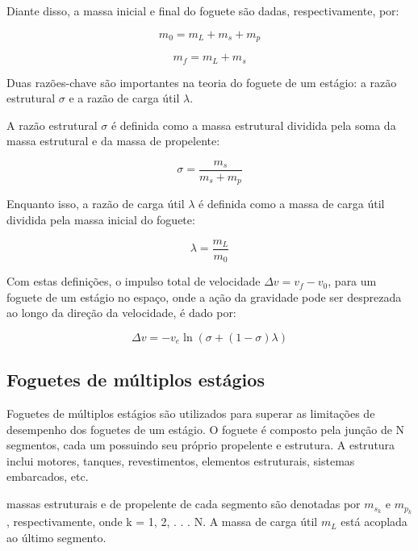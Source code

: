 \par Diante disso, a massa inicial e final do foguete são dadas, respectivamente, por:

\begin{equation}
m_0 = m_L + m_s + m_p   
\end{equation}

\begin{equation}
m_f = m_L + m_s  
\end{equation}

\par Duas razões-chave são importantes na teoria do foguete de um estágio: a razão estrutural $\sigma$ e a razão de carga útil $\lambda$.

\par A razão estrutural $\sigma$ é definida como a massa estrutural dividida pela soma da massa estrutural e da massa de propelente:

\begin{equation}
\sigma = \frac{m_s}{m_s + m_p}
\end{equation}

Enquanto isso, a razão de carga útil $\lambda$ é definida como a massa de carga útil dividida pela massa inicial do foguete:

\begin{equation}
\lambda = \frac{m_L}{m_0}
\end{equation}

Com estas definições, o impulso total de velocidade $\Delta v = v_f - v_0$, para um foguete de um estágio no espaço, onde a ação da gravidade pode ser desprezada ao longo da direção da velocidade, é dado por:

\begin{equation}
\Delta v = -v_e \ln (\sigma + (1 - \sigma)\lambda) 
\end{equation}

\subsection{Foguetes de múltiplos estágios}

\par Foguetes de múltiplos estágios são utilizados para superar as limitações de desempenho dos foguetes de um estágio. O foguete é composto pela junção de N segmentos, cada um possuindo seu próprio propelente e estrutura. A estrutura inclui motores, tanques, revestimentos, elementos estruturais, sistemas embarcados, etc.

\parAs massas estruturais e de propelente de cada segmento são denotadas por $m_{s_k}$ e $m_{p_k}$, respectivamente, onde k = 1, 2, . . . N. A massa de carga útil $m_L$ está acoplada ao último segmento.

